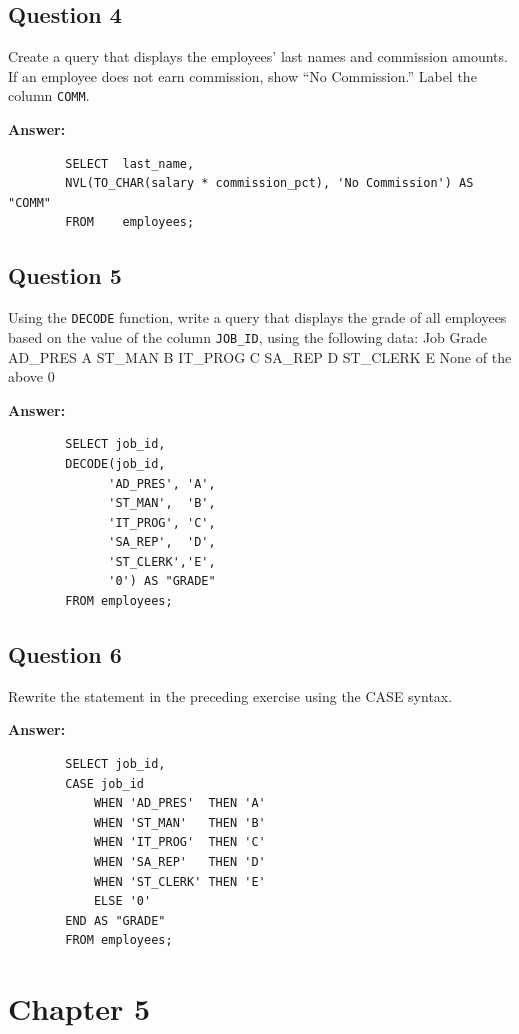 \documentclass[12pt,a4paper]{article}
\begin{document}
\subsection*{Question 4}
Create a query that displays the employees’ last names and commission amounts. If an employee 
does not earn commission, show “No Commission.” Label the column \texttt{COMM}.

\textbf{Answer:}
    \begin{lstlisting}
        SELECT  last_name,
        NVL(TO_CHAR(salary * commission_pct), 'No Commission') AS "COMM"
        FROM    employees;
    \end{lstlisting}
    
\subsection*{Question 5}
Using the \texttt{DECODE} function, write a query that displays the grade of all employees based on the 
value of the column \texttt{JOB\_ID}, using the following data:
    Job                 Grade
    AD\_PRES             A
    ST\_MAN              B
    IT\_PROG             C
    SA\_REP              D
    ST\_CLERK            E
    None of the above    0

\textbf{Answer:}
    \begin{lstlisting}
        SELECT job_id,
        DECODE(job_id,
              'AD_PRES', 'A',
              'ST_MAN',  'B',
              'IT_PROG', 'C',
              'SA_REP',  'D',
              'ST_CLERK','E',
              '0') AS "GRADE"
        FROM employees;
    \end{lstlisting}
    
\subsection*{Question 6}
Rewrite the statement in the preceding exercise using the CASE syntax.

\textbf{Answer:}
    \begin{lstlisting}
        SELECT job_id,
        CASE job_id
            WHEN 'AD_PRES'  THEN 'A'
            WHEN 'ST_MAN'   THEN 'B'
            WHEN 'IT_PROG'  THEN 'C'
            WHEN 'SA_REP'   THEN 'D'
            WHEN 'ST_CLERK' THEN 'E'
            ELSE '0'
        END AS "GRADE"
        FROM employees;
    \end{lstlisting}
    
\section*{Chapter 5}
\end{document}
